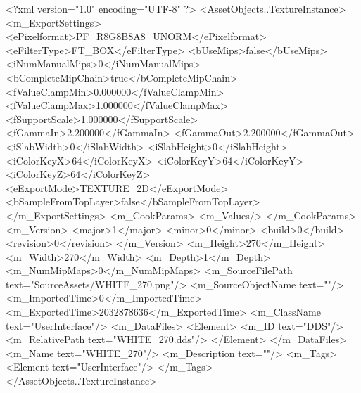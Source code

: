 <?xml version="1.0" encoding="UTF-8" ?>
<AssetObjects..TextureInstance>
	<m_ExportSettings>
		<ePixelformat>PF_R8G8B8A8_UNORM</ePixelformat>
		<eFilterType>FT_BOX</eFilterType>
		<bUseMips>false</bUseMips>
		<iNumManualMips>0</iNumManualMips>
		<bCompleteMipChain>true</bCompleteMipChain>
		<fValueClampMin>0.000000</fValueClampMin>
		<fValueClampMax>1.000000</fValueClampMax>
		<fSupportScale>1.000000</fSupportScale>
		<fGammaIn>2.200000</fGammaIn>
		<fGammaOut>2.200000</fGammaOut>
		<iSlabWidth>0</iSlabWidth>
		<iSlabHeight>0</iSlabHeight>
		<iColorKeyX>64</iColorKeyX>
		<iColorKeyY>64</iColorKeyY>
		<iColorKeyZ>64</iColorKeyZ>
		<eExportMode>TEXTURE_2D</eExportMode>
		<bSampleFromTopLayer>false</bSampleFromTopLayer>
	</m_ExportSettings>
	<m_CookParams>
		<m_Values/>
	</m_CookParams>
	<m_Version>
		<major>1</major>
		<minor>0</minor>
		<build>0</build>
		<revision>0</revision>
	</m_Version>
	<m_Height>270</m_Height>
	<m_Width>270</m_Width>
	<m_Depth>1</m_Depth>
	<m_NumMipMaps>0</m_NumMipMaps>
	<m_SourceFilePath text="SourceAssets/WHITE_270.png"/>
	<m_SourceObjectName text=""/>
	<m_ImportedTime>0</m_ImportedTime>
	<m_ExportedTime>2032878636</m_ExportedTime>
	<m_ClassName text="UserInterface"/>
	<m_DataFiles>
		<Element>
			<m_ID text="DDS"/>
			<m_RelativePath text="WHITE_270.dds"/>
		</Element>
	</m_DataFiles>
	<m_Name text="WHITE_270"/>
	<m_Description text=""/>
	<m_Tags>
		<Element text="UserInterface"/>
	</m_Tags>
</AssetObjects..TextureInstance>

